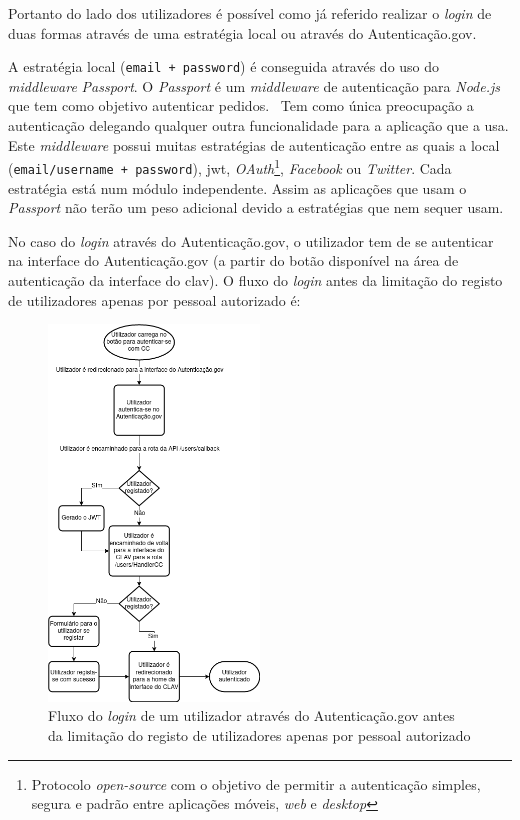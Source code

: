 Portanto do lado dos utilizadores é possível como já referido realizar o \textit{login} de duas formas através de uma estratégia local ou através do Autenticação.gov.

A estratégia local (\texttt{email + password}) é conseguida através do uso do \textit{middleware} \textit{Passport}.
O \textit{Passport} é um \textit{middleware} de autenticação para \textit{Node.js} que tem como objetivo autenticar pedidos.~\cite{passport} Tem como única preocupação a autenticação delegando qualquer outra funcionalidade para a aplicação que a usa. Este \textit{middleware} possui muitas estratégias de autenticação entre as quais a local (\texttt{email/username + password}), \acrshort{jwt}, \textit{OAuth}\footnote{Protocolo \textit{open-source} com o objetivo de permitir a autenticação simples, segura e padrão entre aplicações móveis, \textit{web} e \textit{desktop}}, \textit{Facebook} ou \textit{Twitter}. Cada estratégia está num módulo independente. Assim as aplicações que usam o \textit{Passport} não terão um peso adicional devido a estratégias que nem sequer usam.

No caso do \textit{login} através do Autenticação.gov, o utilizador tem de se autenticar na interface do Autenticação.gov (a partir do botão disponível na área de autenticação da interface do \acrshort{clav}). O fluxo do \textit{login} antes da limitação do registo de utilizadores apenas por pessoal autorizado é:

\begin{figure}[H]
    \begin{center}
        \includegraphics[width=0.5\textwidth]{img/authgov.png}
    \end{center}
    \caption{Fluxo do \textit{login} de um utilizador através do Autenticação.gov antes da limitação do registo de utilizadores apenas por pessoal autorizado}\label{fig:authgov}
\end{figure}

